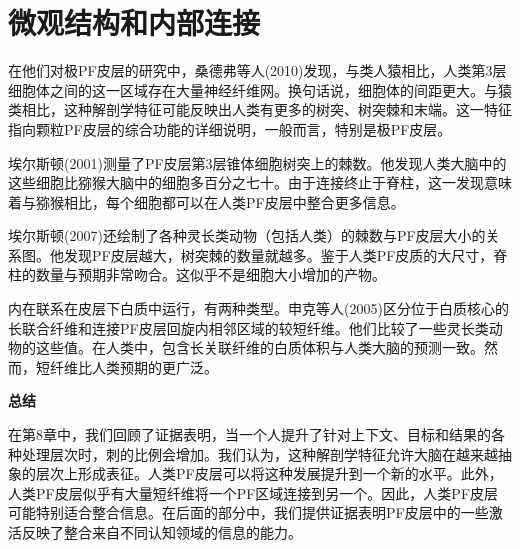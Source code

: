\section{微观结构和内部连接}
在他们对极PF皮层的研究中，桑德弗等人(2010)发现，与类人猿相比，人类第3层细胞体之间的这一区域存在大量神经纤维网。换句话说，细胞体的间距更大。与猿类相比，这种解剖学特征可能反映出人类有更多的树突、树突棘和末端。这一特征指向颗粒PF皮层的综合功能的详细说明，一般而言，特别是极PF皮层。
\par
埃尔斯顿(2001)测量了PF皮层第3层锥体细胞树突上的棘数。他发现人类大脑中的这些细胞比猕猴大脑中的细胞多百分之七十。由于连接终止于脊柱，这一发现意味着与猕猴相比，每个细胞都可以在人类PF皮层中整合更多信息。
\par
埃尔斯顿(2007)还绘制了各种灵长类动物（包括人类）的棘数与PF皮层大小的关系图。他发现PF皮层越大，树突棘的数量就越多。鉴于人类PF皮质的大尺寸，脊柱的数量与预期非常吻合。这似乎不是细胞大小增加的产物。
\par
内在联系在皮层下白质中运行，有两种类型。申克等人(2005)区分位于白质核心的长联合纤维和连接PF皮层回旋内相邻区域的较短纤维。他们比较了一些灵长类动物的这些值。在人类中，包含长关联纤维的白质体积与人类大脑的预测一致。然而，短纤维比人类预期的更广泛。
\par
\textbf{总结}
\par
在第8章中，我们回顾了证据表明，当一个人提升了针对上下文、目标和结果的各种处理层次时，刺的比例会增加。我们认为，这种解剖学特征允许大脑在越来越抽象的层次上形成表征。人类PF皮层可以将这种发展提升到一个新的水平。此外，人类PF皮层似乎有大量短纤维将一个PF区域连接到另一个。因此，人类PF皮层可能特别适合整合信息。在后面的部分中，我们提供证据表明PF皮层中的一些激活反映了整合来自不同认知领域的信息的能力。
